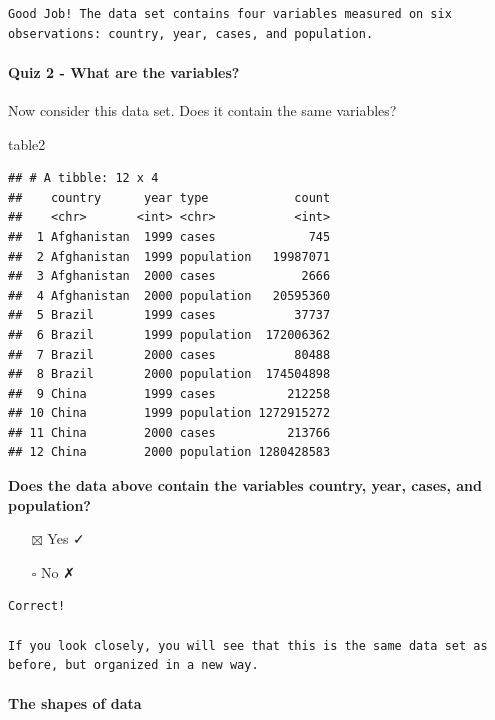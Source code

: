 \documentclass[
]{article}
\newenvironment{Shaded}{\begin{snugshade}}{\end{snugshade}}
\newcommand{\NormalTok}[1]{#1}
\providecommand{\tightlist}{%
  \setlength{\itemsep}{0pt}\setlength{\parskip}{0pt}}
\begin{document}
\begin{verbatim}
Good Job! The data set contains four variables measured on six observations: country, year, cases, and population.
\end{verbatim}

\hypertarget{quiz-2---what-are-the-variables}{%
\paragraph{Quiz 2 - What are the
variables?}\label{quiz-2---what-are-the-variables}}

Now consider this data set. Does it contain the same variables?

\begin{Shaded}
\begin{Highlighting}[]
\NormalTok{table2}
\end{Highlighting}
\end{Shaded}

\begin{verbatim}
## # A tibble: 12 x 4
##    country      year type            count
##    <chr>       <int> <chr>           <int>
##  1 Afghanistan  1999 cases             745
##  2 Afghanistan  1999 population   19987071
##  3 Afghanistan  2000 cases            2666
##  4 Afghanistan  2000 population   20595360
##  5 Brazil       1999 cases           37737
##  6 Brazil       1999 population  172006362
##  7 Brazil       2000 cases           80488
##  8 Brazil       2000 population  174504898
##  9 China        1999 cases          212258
## 10 China        1999 population 1272915272
## 11 China        2000 cases          213766
## 12 China        2000 population 1280428583
\end{verbatim}

\textbf{Does the data above contain the variables country, year, cases,
and population?}

\begin{itemize}
\tightlist
\item[$\boxtimes$]
  Yes ✓
\item[$\square$]
  No ✗
\end{itemize}

\begin{verbatim}
Correct!

If you look closely, you will see that this is the same data set as before, but organized in a new way.
\end{verbatim}

\hypertarget{the-shapes-of-data}{%
\paragraph{The shapes of data}\label{the-shapes-of-data}}
\end{document}
